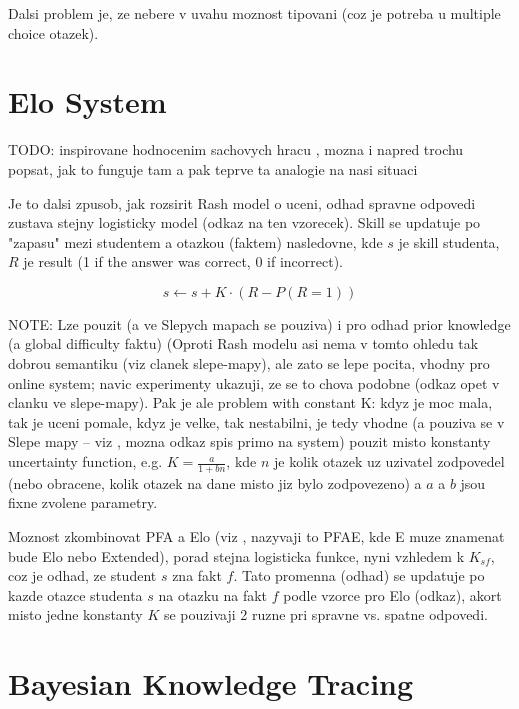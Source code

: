 \documentclass[a4paper, 12pt, twoside]{fithesis2}		%
\renewcommand{\_}{\leavevmode \kern0.0em\vbox{\hrule width0.4em}}
\newcounter{choice}
\begin{document}
Dalsi problem je, ze nebere v uvahu moznost tipovani (coz je potreba u multiple choice otazek).

\section{Elo System}
\label{sec:elo}


TODO: inspirovane hodnocenim sachovych hracu \cite{elo-rating}, mozna i napred trochu popsat, jak to funguje tam a pak teprve ta analogie na nasi situaci

Je to dalsi zpusob, jak rozsirit Rash model o uceni, odhad spravne odpovedi zustava stejny logisticky model (odkaz na ten vzorecek). Skill se updatuje po "zapasu" mezi studentem a otazkou (faktem) nasledovne,
kde $s$ je skill studenta, $R$ je result (1 if the answer was correct, 0 if incorrect).

$$
s \gets s + K \cdot (R - P(R = 1))
$$

NOTE: Lze pouzit (a ve Slepych mapach \cite{slepe-mapy} se pouziva) i pro odhad prior knowledge (a global difficulty faktu)
(Oproti Rash modelu asi nema v tomto ohledu tak dobrou semantiku (viz clanek slepe-mapy), ale zato se lepe pocita, vhodny pro online system; navic experimenty ukazuji, ze se to chova podobne (odkaz opet v clanku ve slepe-mapy).
Pak je ale problem with constant K: kdyz je moc mala, tak je uceni pomale, kdyz je velke, tak nestabilni, je tedy vhodne (a pouziva se v Slepe mapy -- viz \cite{slepe-mapy}, mozna odkaz spis primo na system) pouzit misto konstanty
uncertainty function, e.g. $K = \frac{a}{1 + bn}$, kde $n$ je kolik otazek uz uzivatel zodpovedel (nebo obracene, kolik otazek na dane misto jiz bylo zodpovezeno) a $a$ a $b$ jsou fixne zvolene parametry.

Moznost zkombinovat PFA a Elo (viz \cite{slepe-mapy}, nazyvaji to PFAE, kde E muze znamenat bude Elo nebo Extended), porad stejna logisticka funkce, nyni vzhledem k $K_{sf}$, coz je odhad, ze student $s$ zna fakt $f$. Tato promenna (odhad) se updatuje po kazde otazce studenta $s$ na otazku na fakt $f$ podle vzorce pro Elo (odkaz), akort misto jedne konstanty $K$ se pouzivaji 2 ruzne pri spravne vs. spatne odpovedi.


\section{Bayesian Knowledge Tracing}
\label{sec:bayesian-network}
\end{document}

